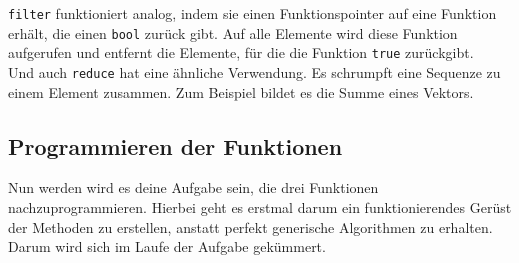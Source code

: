\lstinline{filter} funktioniert analog, indem sie einen Funktionspointer auf eine Funktion erhält, die einen \lstinline{bool} zurück gibt.
Auf alle Elemente wird diese Funktion aufgerufen und entfernt die Elemente, für die die Funktion \lstinline{true} zurückgibt. \\

Und auch \lstinline{reduce} hat eine ähnliche Verwendung.
Es schrumpft eine Sequenze zu einem Element zusammen.
Zum Beispiel bildet es die Summe eines Vektors.

\subsection{Programmieren der Funktionen}

Nun werden wird es deine Aufgabe sein, die drei Funktionen nachzuprogrammieren.
Hierbei geht es erstmal darum ein funktionierendes Gerüst der Methoden zu erstellen, anstatt perfekt generische Algorithmen zu erhalten.
Darum wird sich im Laufe der Aufgabe gekümmert.

